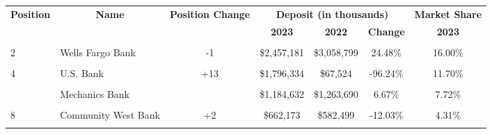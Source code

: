 \begin{table}
\centering
\begin{tabular}{llccccc}
\toprule
\multicolumn{1}{c}{\textbf{Position}} & \multicolumn{1}{c}{\textbf{Name}} & \multicolumn{1}{c}{\textbf{Position Change}} & \multicolumn{3}{c}{\textbf{Deposit (in thousands)}} & \multicolumn{1}{c}{\textbf{Market Share}} \\
\cmidrule(l{3pt}r{3pt}){1-1} \cmidrule(l{3pt}r{3pt}){2-2} \cmidrule(l{3pt}r{3pt}){3-3} \cmidrule(l{3pt}r{3pt}){4-6} \cmidrule(l{3pt}r{3pt}){7-7}
\multicolumn{3}{c}{\textbf{ }} & \multicolumn{1}{c}{\textbf{2023}} & \multicolumn{1}{c}{\textbf{2022}} & \multicolumn{1}{c}{\textbf{Change}} & \multicolumn{1}{c}{\textbf{2023}} \\
\cmidrule(l{3pt}r{3pt}){4-4} \cmidrule(l{3pt}r{3pt}){5-5} \cmidrule(l{3pt}r{3pt}){6-6} \cmidrule(l{3pt}r{3pt}){7-7}
\cellcolor{gray!10}{1} & \cellcolor{gray!10}{Jpmorgan Chase Bank} & \cellcolor{gray!10}{+2} & \cellcolor{gray!10}{\$2,706,513} & \cellcolor{gray!10}{\$2,404,277} & \cellcolor{gray!10}{-11.17\%} & \cellcolor{gray!10}{17.63\%}\\
2 & Wells Fargo Bank & -1 & \$2,457,181 & \$3,058,799 & 24.48\% & 16.00\%\\
\cellcolor{gray!10}{3} & \cellcolor{gray!10}{Bank of America} & \cellcolor{gray!10}{-1} & \cellcolor{gray!10}{\$2,284,561} & \cellcolor{gray!10}{\$2,560,865} & \cellcolor{gray!10}{12.09\%} & \cellcolor{gray!10}{14.88\%}\\
4 & U.S. Bank & +13 & \$1,796,334 & \$67,524 & -96.24\% & 11.70\%\\
\cellcolor{gray!10}{5} & \cellcolor{gray!10}{Montecito Bank \& Trust} & \cellcolor{gray!10}{} & \cellcolor{gray!10}{\$1,625,884} & \cellcolor{gray!10}{\$1,970,211} & \cellcolor{gray!10}{21.18\%} & \cellcolor{gray!10}{10.59\%}\\
\addlinespace
6 & Mechanics Bank &  & \$1,184,632 & \$1,263,690 & 6.67\% & 7.72\%\\
\cellcolor{gray!10}{7} & \cellcolor{gray!10}{American Riviera Bank} & \cellcolor{gray!10}{} & \cellcolor{gray!10}{\$718,658} & \cellcolor{gray!10}{\$871,855} & \cellcolor{gray!10}{21.32\%} & \cellcolor{gray!10}{4.68\%}\\
8 & Community West Bank & +2 & \$662,173 & \$582,499 & -12.03\% & 4.31\%\\
\cellcolor{gray!10}{9} & \cellcolor{gray!10}{Pacific Premier Bank} & \cellcolor{gray!10}{-1} & \cellcolor{gray!10}{\$588,737} & \cellcolor{gray!10}{\$685,184} & \cellcolor{gray!10}{16.38\%} & \cellcolor{gray!10}{3.83\%}\\

\end{tabular}
\end{table}
